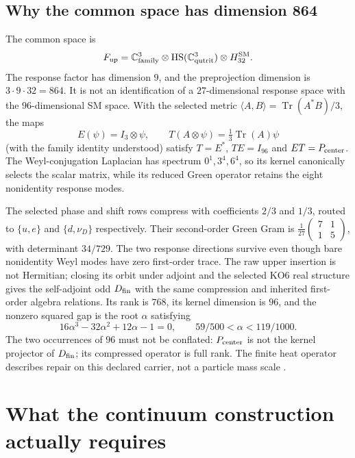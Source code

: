 \documentclass[11pt]{article}
\begin{document}
\subsection{Why the common space has dimension 864}
\label{sec:fsb02c}
The common space is
\[
 F_{\rm up}=\mathbb C^3_{\rm family}\otimes
 \operatorname{HS}(\mathbb C^3_{\rm qutrit})\otimes H_{32}^{\rm SM}.
\]
The response factor has dimension $9$, and the preprojection dimension is
$3\cdot9\cdot32=864$. It is not an identification of a $27$-dimensional
response space with the $96$-dimensional SM space. With the selected metric
$\langle A,B\rangle=\operatorname{Tr}(A^*B)/3$, the maps
\[
 E(\psi)=I_3\otimes\psi,\qquad T(A\otimes\psi)
 =\tfrac13\operatorname{Tr}(A)\psi
\]
(with the family identity understood) satisfy $T=E^*$, $TE=I_{96}$ and
$ET=P_{\rm center}$. The Weyl-conjugation Laplacian has spectrum
$0^1,3^4,6^4$, so its kernel canonically selects the scalar matrix, while
its reduced Green operator retains the eight nonidentity response modes.

The selected phase and shift rows compress with coefficients $2/3$ and
$1/3$, routed to $\{u,e\}$ and $\{d,\nu_D\}$ respectively. Their
second-order Green Gram is
$\frac1{27}\left(\begin{smallmatrix}7&1\\1&5\end{smallmatrix}\right)$,
with determinant $34/729$. The two response directions survive even though
bare nonidentity Weyl modes have zero first-order trace. The raw upper
insertion is not Hermitian; closing its orbit under adjoint and the selected
KO6 real structure gives the self-adjoint odd $D_{\rm fin}$ with the same
compression and inherited first-order algebra relations. Its rank is $768$,
its kernel dimension is $96$, and the nonzero squared gap is the root
$\alpha$ satisfying
\[
 16\alpha^3-32\alpha^2+12\alpha-1=0,
 \qquad 59/500<\alpha<119/1000.
\]
The two occurrences of $96$ must not be conflated:
$P_{\rm center}$ is not the kernel projector of $D_{\rm fin}$; its
compressed operator is full rank. The finite heat operator describes repair
on this declared carrier, not a particle mass scale \cite{FSB02c}.

\section{What the continuum construction actually requires}
\label{sec:continuum-compiler}
\end{document}
